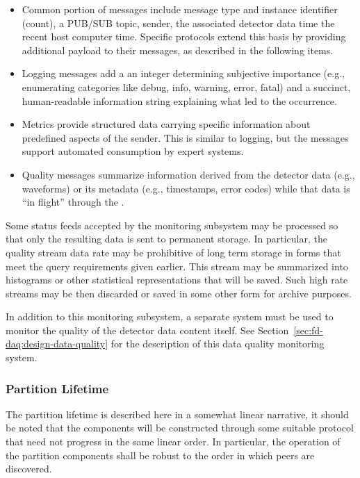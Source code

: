\begin{itemize}
\item Common portion of messages include message type and instance identifier (count), a PUB/SUB topic, sender, the associated detector data time the recent host computer time.  Specific protocols extend this basis by providing additional payload to their messages, as described in the following items.
 
\item Logging messages add a an integer determining subjective importance (e.g., enumerating categories like debug, info, warning, error, fatal) and a succinct, human-readable information string explaining what led to the occurrence.
  
\item Metrics provide structured data carrying specific information about predefined aspects of the sender. 
  This is similar to logging, but the messages support automated consumption by expert systems.  

\item Quality messages summarize information derived from the detector data (e.g., waveforms) or its metadata (e.g., timestamps, error codes) while that data is ``in flight'' through the .

\end{itemize}

Some status feeds accepted by the monitoring subsystem may be processed so that only the resulting data is sent to permanent storage. 
In particular, the quality stream data rate may be prohibitive of long term storage in forms that meet the query requirements given earlier. 
This stream may be summarized into histograms or other statistical representations that will be saved.
Such high rate streams may be then discarded or saved in some other form for archive purposes.

In addition to this   monitoring subsystem, a separate system must be used to monitor the quality of the detector data content itself.  See Section~\ref{sec:fd-daq:design-data-quality} for the description of this data quality monitoring system.

\subsubsection{Partition Lifetime}
\label{sec:daq:partition-lifetime}

The partition lifetime is described here in a somewhat linear narrative, it should be noted that the components will be constructed through some suitable protocol that need not progress in the same linear order. 
In particular, the operation of the partition components shall be robust to the order in which peers are discovered.

